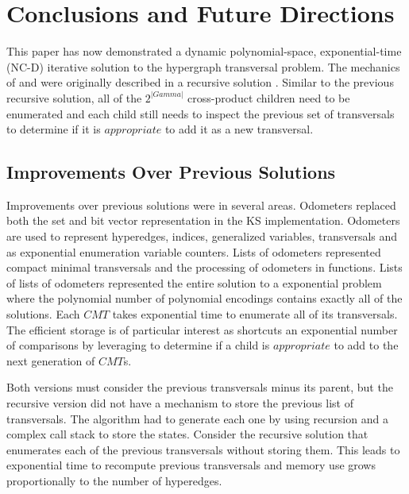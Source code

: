 



















\chapter{Conclusions and Future Directions}

This paper has now demonstrated a dynamic polynomial-space, exponential-time (NC-D) iterative solution to the hypergraph transversal problem. The mechanics of  and  were originally described in a recursive solution \cite{khachiyan2006efficient}. Similar to the previous recursive solution, all of the $2^{|Gamma|}$ cross-product children need to be enumerated and each child still needs to inspect the previous set of transversals to determine if it is $appropriate$ to add it as a new transversal.

\section{Improvements Over Previous Solutions}
Improvements over previous solutions were in several areas. Odometers replaced both the set and bit vector representation in the KS implementation. Odometers are used to represent hyperedges, indices, generalized variables, transversals and as exponential enumeration variable counters. Lists of odometers represented compact minimal transversals and the processing of odometers in functions. Lists of lists of odometers represented the entire solution to a exponential problem where the polynomial number of polynomial encodings contains exactly all of the solutions. Each $CMT$ takes exponential time to enumerate all of its transversals. The efficient storage is of particular interest as  shortcuts an exponential number of comparisons by leveraging  to determine if a child is $appropriate$ to add to the next generation of $CMT$s. 

Both versions must consider the previous transversals minus its parent, but the recursive version did not have a mechanism to store the previous list of transversals. The algorithm had to generate each one by using recursion and a complex call stack to store the states. Consider the recursive solution that enumerates each of the previous transversals without storing them. This leads to exponential time to recompute previous transversals and memory use grows proportionally to the number of hyperedges.


